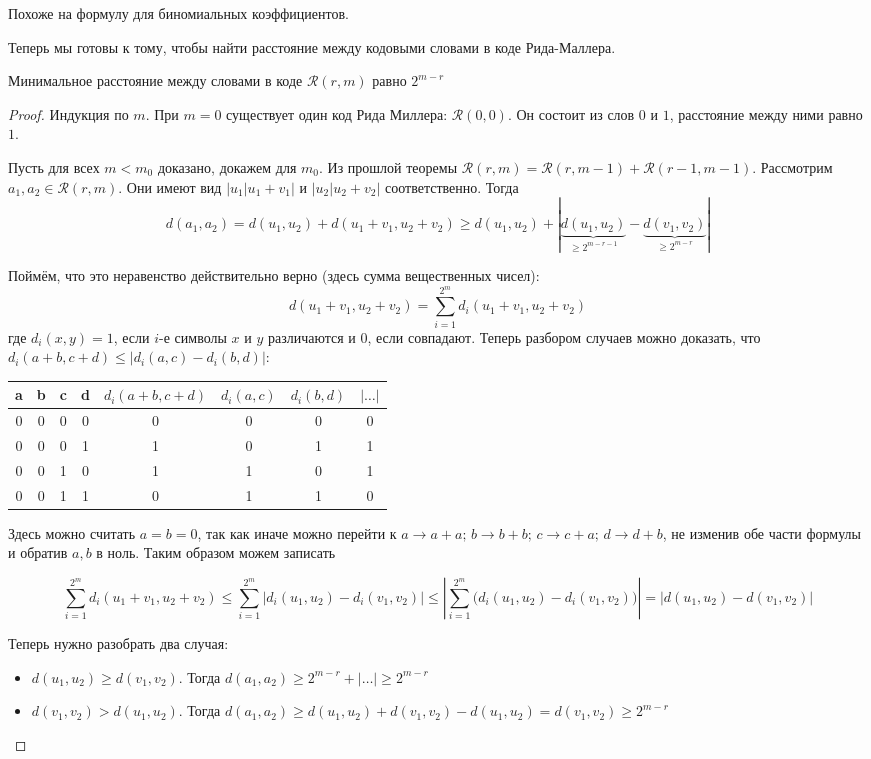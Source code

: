 \begin{note}
Похоже на формулу для биномиальных коэффициентов.
\end{note}

Теперь мы готовы к тому, чтобы найти расстояние между кодовыми словами в коде Рида-Маллера.

\begin{theorem}
Минимальное расстояние между словами в коде $\mathscr{R}(r,m)$ равно $2^{m-r}$
\end{theorem}

\begin{proof}
Индукция по $m$. При $m=0$ существует один код Рида Миллера: $\mathscr{R}(0,0)$. Он 
состоит из слов $0$ и $1$, расстояние между ними равно $1$.

Пусть для всех $m < m_0$ доказано, докажем для $m_0$. Из прошлой теоремы $\mathscr{R}(r,m) = 
\mathscr{R}(r,m-1) + \mathscr{R}(r-1,m-1)$. Рассмотрим $a_1, a_2 \in \mathscr{R}(r,m)$. Они имеют
вид $|u_1|u_1+v_1|$ и $|u_2|u_2+v_2|$ соответственно. Тогда 
$$d(a_1,a_2) = d(u_1, u_2) + d(u_1 + v_1, u_2 + v_2) \ge d(u_1,u_2) +
 |\underbrace{d(u_1,u_2)}_{\ge 2^{m-r-1}} - \underbrace{d(v_1,v_2)}_{\ge 2^{m-r}}|$$
 
 Поймём, что это неравенство действительно верно (здесь сумма вещественных чисел):
 $$d(u_1 + v_1, u_2 + v_2) = \sum\limits_{i=1}^{2^m} d_i(u_1 + v_1, u_2 + v_2)$$
 где $d_i(x,y) = 1$, если $i$-е символы $x$ и $y$ различаются и $0$, если совпадают.
 Теперь разбором случаев можно доказать, что $d_i(a+b,c+d) \le |d_i(a,c) - d_i(b,d)|$:
 \begin{center}
 \begin{tabular}{| c c c c | c c c | c |}
 \hline
 a & b & c & d & $d_i(a+b,c+d)$ & $d_i(a,c)$ & $d_i(b,d)$ & $|\ldots|$ \\
 \hline
 0 & 0 & 0 & 0 & 0 & 0 & 0 & 0 \\
 0 & 0 & 0 & 1 & 1 & 0 & 1 & 1 \\
 0 & 0 & 1 & 0 & 1 & 1 & 0 & 1 \\
 0 & 0 & 1 & 1 & 0 & 1 & 1 & 0 \\
 \hline
 \end{tabular}
 \end{center}

Здесь можно считать $a=b=0$, так как иначе можно перейти к $a \to a+a;\, b \to b+b;\, c \to c+a;\, d \to d + b$,
не изменив обе части формулы и обратив $a,b$ в ноль. Таким образом можем записать

$$\sum\limits_{i=1}^{2^m} d_i(u_1 + v_1, u_2 + v_2) \le \sum\limits_{i=1}^{2^m} |d_i(u_1,u_2) - d_i(v_1,v_2)| \le
  |\sum\limits_{i=1}^{2^m} \big(d_i(u_1,u_2) - d_i(v_1,v_2)\big)| = |d(u_1,u_2) - d(v_1,v_2)|$$

Теперь нужно разобрать два случая:
\begin{itemize}
\item $d(u_1,u_2) \ge d(v_1, v_2)$. Тогда $d(a_1, a_2) \ge 2^{m-r} + |\ldots| \ge 2^{m-r}$
\item $d(v_1,v_2) > d(u_1, u_2)$. Тогда $d(a_1,a_2) \ge d(u_1,u_2) + d(v_1, v_2) - d(u_1,u_2) = d(v_1,v_2) \ge 2^{m-r}$
\end{itemize}
\end{proof}


